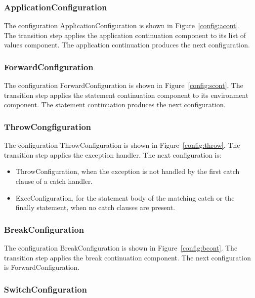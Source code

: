 \documentclass[a4paper,oneside,fleqn]{article}
\begin{document}
\subsubsection{ApplicationConfiguration}
\label{subsubsec:applicationconfig}

The configuration ApplicationConfiguration is shown in Figure~\ref{config:acont}.
The transition step applies the application continuation component to its list of values component.
The application continuation produces the next configuration.


\subsubsection{ForwardConfiguration}
\label{subsubsec:forwardconfig}

The configuration ForwardConfiguration is shown in Figure~\ref{config:scont}.
The transition step applies the statement continuation component to its environment component.
The statement continuation produces the next configuration.


\subsubsection{ThrowCongfiguration}
\label{subsubsec:throwconfig}

The configuration ThrowConfiguration is shown in Figure~\ref{config:throw}.
The transition step applies the exception handler.
The next configuration is:

\begin{itemize}
    \item ThrowConfiguration, when the exception is not handled by the first catch clause of a catch handler.
    \item ExecConfiguration, for the statement body of the matching catch or the finally statement, when no catch clauses are present.
\end{itemize}


\subsubsection{BreakConfiguration}
\label{subsubsec:breakconfig}

The configuration BreakConfiguration is shown in Figure~\ref{config:bcont}.
The transition step applies the break continuation component.
The next configuration is ForwardConfiguration.


\subsubsection{SwitchConfiguration}
\label{subsubsec:switchconfig}
\end{document}

